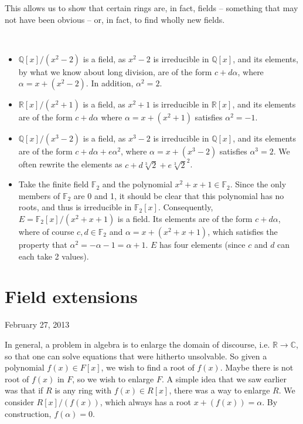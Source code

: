 \documentclass{../mathnotes}
\begin{document}
This allows us to show that certain rings are, in fact, fields -- something that may not have been obvious -- or, in fact,
to find wholly new fields.
\begin{exmp}{\ \\} 
    \begin{itemize}
        \item $\mathbb{Q}[x]/(x^2-2)$ is a field, as $x^2-2$ is irreducible in $\mathbb{Q}[x]$, and its elements,
            by what we know about long division, are of the form $c+d\alpha$, where $\alpha=x+(x^2-2)$. In addition,
            $\alpha^2=2$.
        \item $\mathbb{R}[x]/(x^2+1)$ is a field, as $x^2+1$ is irreducible in $\mathbb{R}[x]$, and its elements are of
            the form $c+d\alpha$ where $\alpha=x+(x^2+1)$ satisfies $\alpha^2=-1$.
        \item $\mathbb{Q}[x]/(x^3-2)$ is a field, as $x^3-2$ is irreducible in $\mathbb{Q}[x]$, and its elements are of
            the form $c+d\alpha+e\alpha^2$, where $\alpha=x+(x^3-2)$ satisfies $\alpha^3=2$. We often rewrite the elements
            as $c+d\sqrt[3]{2}+e\sqrt[3]{2}^2$.
        \item Take the finite field $\mathbb{F}_2$ and the polynomial $x^2+x+1\in\mathbb{F}_2$. Since the only members of
            $\mathbb{F}_2$ are 0 and 1, it should be clear that this polynomial has no roots, and thus is irreducible in $\mathbb{F}_2[x]$.
            Consequently, $E=\mathbb{F}_2[x]/(x^2+x+1)$ is a field. Its elements are of the form $c+d\alpha$, where of course $c,d\in\mathbb{F}_2$
            and $\alpha=x+(x^2+x+1)$, which satisfies the property that $\alpha^2=-\alpha-1=\alpha+1$. $E$ has four elements
            (since $c$ and $d$ can each take 2 values).
    \end{itemize}
\end{exmp}


\section{Field extensions}
February 27, 2013

In general, a problem in algebra is to enlarge the domain of discourse, i.e. $\mathbb{R}\to\mathbb{C}$, so that one can solve
equations that were hitherto unsolvable. So given a polynomial $f(x)\in F[x]$, we wish to find a root of $f(x)$. Maybe there is
not root of $f(x)$ in $F$, so we wish to enlarge $F$.
A simple idea that we saw earlier was that if $R$ is any ring with $f(x)\in R[x]$, there was a way to enlarge $R$.
We consider $R[x]/(f(x))$, which always has a root $x+(f(x))=\alpha$. By construction, $f(\alpha)=0$.
\end{document}

